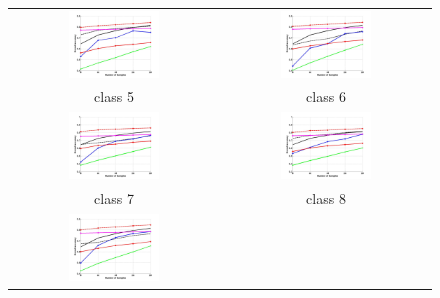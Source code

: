 \begin{figure}[h]
	\centering
	\begin{tabular}{cc}
		\includegraphics[width=0.45\textwidth]{appendix/tables/MNIST_Rate_3_class_5.jpg} & 
		\includegraphics[width=0.45\textwidth]{appendix/tables/MNIST_Rate_3_class_6.jpg} \\
		class 5 & class 6\\
		\includegraphics[width=0.45\textwidth]{appendix/tables/MNIST_Rate_3_class_7.jpg} & 
		\includegraphics[width=0.45\textwidth]{appendix/tables/MNIST_Rate_3_class_8.jpg} \\
		class 7 & class 8\\
		\includegraphics[width=0.45\textwidth]{appendix/tables/MNIST_Rate_3_class_9.jpg} & 

\end{tabular}
\end{figure}
